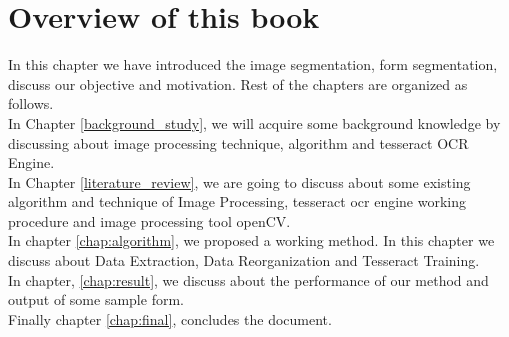 \section{Overview of this book}
In this chapter we have introduced the image segmentation, form segmentation, discuss our objective and motivation. Rest of the chapters are organized as follows. \\
In Chapter \ref{background_study}, we will acquire some background knowledge by discussing about image processing technique, algorithm and tesseract OCR Engine. \\
In Chapter \ref{literature_review}, we are going to discuss about some existing algorithm and technique of Image Processing, tesseract ocr engine working procedure and image processing tool openCV. \\
In chapter \ref{chap:algorithm}, we proposed a working method. In this chapter we discuss about Data Extraction, Data Reorganization and Tesseract Training. \\
In chapter, \ref{chap:result}, we discuss about the performance of our method and output of some sample form.\\
Finally chapter \ref{chap:final}, concludes the document.
